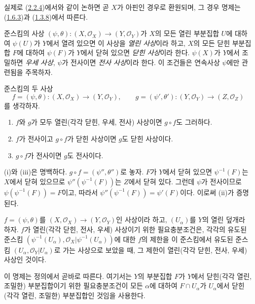 실제로 (\hyperref[I.2.2.4-ko]{2.2.4})에서와 같이 논하면 곧 $X$가
아핀인 경우로 환원되며, 그 경우 명제는
(\hyperref[I.1.6.3-ko]{1.6.3})과
(\hyperref[I.1.3.8-ko]{1.3.8})에서 따른다.

\begin{env}[2.2.6]
\label{I.2.2.6-ko}
준스킴의 사상
$(\psi,\theta):(X,\mathscr{O}_X)\to(Y,\mathscr{O}_Y)$가 $X$의 모든
열린 부분집합 $U$에 대하여 $\psi(U)$가 $Y$에서 열려 있으면 이 사상을
\emph{열린 사상}이라 하고, $X$의 모든 닫힌 부분집합 $F$에 대하여
$\psi(F)$가 $Y$에서 닫혀 있으면 \emph{닫힌 사상}이라 한다.
$\psi(X)$가 $Y$에서 조밀하면 \emph{우세 사상}, $\psi$가 전사이면
\emph{전사 사상}이라 한다. 이 조건들은 연속사상 $\psi$에만 관련됨을
주목하자.
\end{env}

\begin{proposition}[2.2.7]
\label{I.2.2.7-ko}
준스킴의 두 사상
\[
  f=(\psi,\theta):(X,\mathscr{O}_X)\to(Y,\mathscr{O}_Y),
  \qquad
  g=(\psi',\theta'):(Y,\mathscr{O}_Y)\to(Z,\mathscr{O}_Z)
\]
를 생각하자.
\begin{enumerate}
  \item[\rm(i)] $f$와 $g$가 모두 열린(각각 닫힌, 우세, 전사) 사상이면
    $g\circ f$도 그러하다.
  \item[\rm(ii)] $f$가 전사이고 $g\circ f$가 닫힌 사상이면 $g$도 닫힌
    사상이다.
  \item[\rm(iii)] $g\circ f$가 전사이면 $g$도 전사이다.
\end{enumerate}
\end{proposition}

(i)와 (iii)은 명백하다. $g\circ f=(\psi'',\theta'')$로 놓자. $F$가
$Y$에서 닫혀 있으면 $\psi^{-1}(F)$는 $X$에서 닫혀 있으므로
$\psi''(\psi^{-1}(F))$는 $Z$에서 닫혀 있다. 그런데 $\psi$가 전사이므로
$\psi(\psi^{-1}(F))=F$이고, 따라서
$\psi''(\psi^{-1}(F))=\psi'(F)$이다. 이로써 (ii)가 증명된다.

\begin{proposition}[2.2.8]
\label{I.2.2.8-ko}
$f=(\psi,\theta)$를
$(X,\mathscr{O}_X)\to(Y,\mathscr{O}_Y)$인 사상이라 하고,
$(U_\alpha)$를 $Y$의 열린 덮개라 하자. $f$가 열린(각각 닫힌, 전사,
우세) 사상이기 위한 필요충분조건은, 각각의 유도된 준스킴
$(\psi^{-1}(U_\alpha),\mathscr{O}_X|\psi^{-1}(U_\alpha))$에 대한 $f$의
제한을 이 준스킴에서 유도된 준스킴
$(U_\alpha,\mathscr{O}_Y|U_\alpha)$로 가는 사상으로 보았을 때, 그
제한이 열린(각각 닫힌, 전사, 우세) 사상인 것이다.
\end{proposition}

이 명제는 정의에서 곧바로 따른다. 여기서는 $Y$의 부분집합 $F$가
$Y$에서 닫힌(각각 열린, 조밀한) 부분집합이기 위한 필요충분조건이
모든 $\alpha$에 대하여 $F\cap U_\alpha$가 $U_\alpha$에서 닫힌(각각
열린, 조밀한) 부분집합인 것임을 사용한다.

